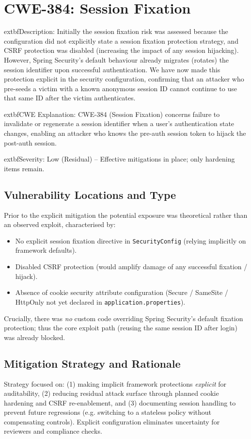 \documentclass[]{UCD_CS_FYP_Report}
\begin{document}
\section{CWE-384: Session Fixation}

	extbf{Description}: Initially the session fixation risk was assessed because the configuration did not explicitly state a session fixation protection strategy, and CSRF protection was disabled (increasing the impact of any session hijacking). However, Spring Security's default behaviour already migrates (rotates) the session identifier upon successful authentication. We have now made this protection explicit in the security configuration, confirming that an attacker who pre-seeds a victim with a known anonymous session ID cannot continue to use that same ID after the victim authenticates.

	extbf{CWE Explanation}: CWE-384 (Session Fixation) concerns failure to invalidate or regenerate a session identifier when a user's authentication state changes, enabling an attacker who knows the pre-auth session token to hijack the post-auth session.

	extbf{Severity}: Low (Residual) – Effective mitigations in place; only hardening items remain.

\subsection*{Vulnerability Locations and Type}
Prior to the explicit mitigation the potential exposure was theoretical rather than an observed exploit, characterised by:
\begin{itemize}
	\item No explicit session fixation directive in \texttt{SecurityConfig} (relying implicitly on framework defaults).\newline
	\item Disabled CSRF protection (would amplify damage of any successful fixation / hijack).\newline
	\item Absence of cookie security attribute configuration (Secure / SameSite / HttpOnly not yet declared in \texttt{application.properties}).
\end{itemize}
Crucially, there was \emph{no} custom code overriding Spring Security's default fixation protection; thus the core exploit path (reusing the same session ID after login) was already blocked.

\subsection*{Mitigation Strategy and Rationale}
Strategy focused on: (1) making implicit framework protections \emph{explicit} for auditability, (2) reducing residual attack surface through planned cookie hardening and CSRF re-enablement, and (3) documenting session handling to prevent future regressions (e.g. switching to a stateless policy without compensating controls). Explicit configuration eliminates uncertainty for reviewers and compliance checks.
\end{document}
